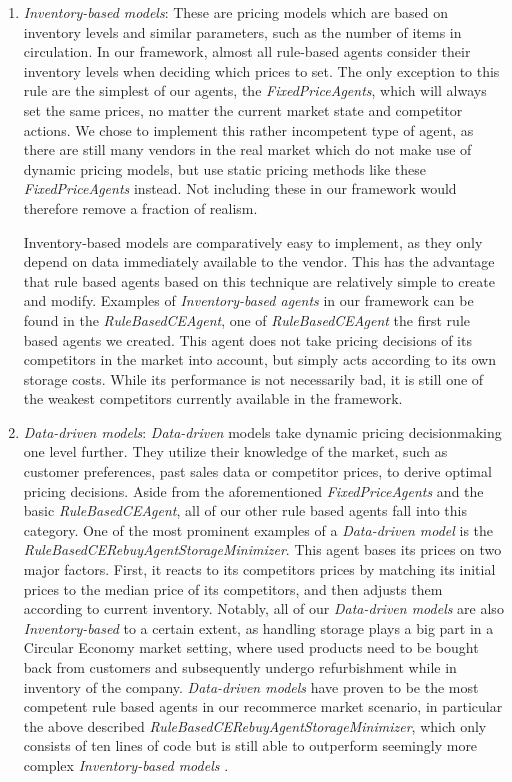 \begin{enumerate}
	\item \emph{Inventory-based models}: These are pricing models which are based on inventory levels and similar parameters, such as the number of items in circulation. In our framework, almost all rule-based agents consider their inventory levels when deciding which prices to set. The only exception to this rule are the simplest of our agents, the \emph{FixedPriceAgents}, which will always set the same prices, no matter the current market state and competitor actions. We chose to implement this rather incompetent type of agent, as there are still many vendors in the real market which do not make use of dynamic pricing models, but use static pricing methods like these \emph{FixedPriceAgents} instead. Not including these in our framework would therefore remove a fraction of realism.

	      Inventory-based models are comparatively easy to implement, as they only depend on data immediately available to the vendor. This has the advantage that rule based agents based on this technique are relatively simple to create and modify. Examples of \emph{Inventory-based agents} in our framework can be found in the \emph{RuleBasedCEAgent}, one of \emph{RuleBasedCEAgent} the first rule based agents we created. This agent does not take pricing decisions of its competitors in the market into account, but simply acts according to its own storage costs. While its performance is not necessarily bad, it is still one of the weakest competitors currently available in the framework. 

	\item \emph{Data-driven models}: \emph{Data-driven} models take dynamic pricing decisionmaking one level further. They utilize their knowledge of the market, such as customer preferences, past sales data or competitor prices, to derive optimal pricing decisions. Aside from the aforementioned \emph{FixedPriceAgents} and the basic \emph{RuleBasedCEAgent}, all of our other rule based agents fall into this category. One of the most prominent examples of a \emph{Data-driven model} is the \emph{RuleBasedCERebuyAgentStorageMinimizer}. This agent bases its prices on two major factors. First, it reacts to its competitors prices by matching its initial prices to the median price of its competitors, and then adjusts them according to current inventory. Notably, all of our \emph{Data-driven models} are also \emph{Inventory-based} to a certain extent, as handling storage plays a big part in a Circular Economy market setting, where used products need to be bought back from customers and subsequently undergo refurbishment while in inventory of the company. \emph{Data-driven models} have proven to be the most competent rule based agents in our recommerce market scenario, in particular the above described \emph{RuleBasedCERebuyAgentStorageMinimizer}, which only consists of ten lines of code but is still able to outperform seemingly more complex \emph{Inventory-based models} .


\end{enumerate}
